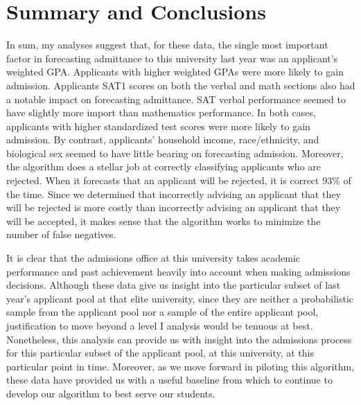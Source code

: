 \documentclass[titlepage]{article}   	%
\begin{document}
\section{Summary and Conclusions}

In sum, my analyses suggest that, for these data, the single most important factor in forecasting admittance to this university last year was an applicant’s weighted GPA. Applicants with higher weighted GPAs were more likely to gain admission. Applicants SAT1 scores on both the verbal and math sections also had a notable impact on forecasting admittance. SAT verbal performance seemed to have slightly more import than mathematics performance. In both cases, applicants with higher standardized test scores were more likely to gain admission. By contrast, applicants’ household income, race/ethnicity, and biological sex seemed to have little bearing on forecasting admission. Moreover, the algorithm does a stellar job at correctly classifying applicants who are rejected. When it forecasts that an applicant will be rejected, it is correct 93\% of the time. Since we determined that incorrectly advising an applicant that they will be rejected is more costly than incorrectly advising an applicant that they will be accepted, it makes sense that the algorithm works to minimize the number of false negatives.
 
It is clear that the admissions office at this university takes academic performance and past achievement heavily into account when making admissions decisions. Although these data give us insight into the particular subset of last year's applicant pool at that elite university, since they are neither a probabilistic sample from the applicant pool nor a sample of the entire applicant pool, justification to move beyond a level I analysis would be tenuous at best. Nonetheless, this analysis can provide us with insight into the admissions process for this particular subset of the applicant pool, at this university, at this particular point in time. Moreover, as we move forward in piloting this algorithm, these data have provided us with a useful baseline from which to continue to develop our algorithm to best serve our students. 
\end{document}
